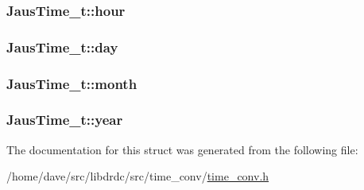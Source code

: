 \hypertarget{structJausTime__t_02eab65ccc0b0eb1ef2ee8a9660193bd}{
\subsubsection[hour]{ {\bf JausTime\_\-t::hour}}}
\label{structJausTime__t_02eab65ccc0b0eb1ef2ee8a9660193bd}


\hypertarget{structJausTime__t_890205c29b20edf5d8194cabfc51bba3}{
\subsubsection[day]{ {\bf JausTime\_\-t::day}}}
\label{structJausTime__t_890205c29b20edf5d8194cabfc51bba3}


\hypertarget{structJausTime__t_e057b2dd81b38f33eebfbe40c451af30}{
\subsubsection[month]{ {\bf JausTime\_\-t::month}}}
\label{structJausTime__t_e057b2dd81b38f33eebfbe40c451af30}


\hypertarget{structJausTime__t_915a14fa672542590d1379f7c26b9e4f}{
\subsubsection[year]{ {\bf JausTime\_\-t::year}}}
\label{structJausTime__t_915a14fa672542590d1379f7c26b9e4f}




The documentation for this struct was generated from the following file:\begin{CompactItemize}
\item 
/home/dave/src/libdrdc/src/time\_\-conv/\hyperlink{time__conv_8h}{time\_\-conv.h}\end{CompactItemize}
